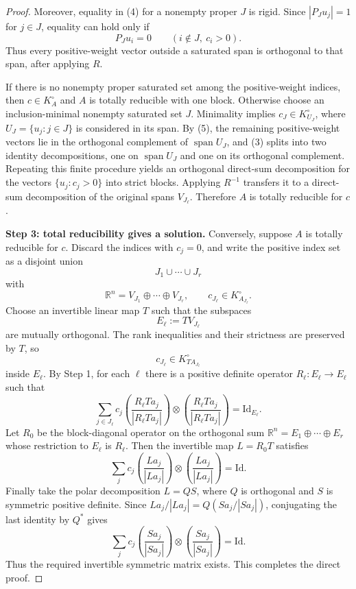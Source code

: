 \documentclass[11pt]{article}
\newcommand{\R}{\mathbb R}
\newcommand{\Id}{\mathrm{Id}}
\newcommand{\spanop}{\operatorname{span}}
\begin{document}
\begin{proof}
Moreover, equality in (4) for a nonempty proper \(J\) is rigid.  Since
\(|P_Ju_j|=1\) for \(j\in J\), equality can hold only if
\[
  P_Ju_i=0
  \qquad(i\notin J,\ c_i>0).
  \tag{5}
\]
Thus every positive-weight vector outside a saturated span is orthogonal to
that span, after applying \(R\).

If there is no nonempty proper saturated set among the positive-weight indices,
then \(c\in K_A^\circ\) and \(A\) is totally reducible with one block.  Otherwise
choose an inclusion-minimal nonempty saturated set \(J\).  Minimality implies
\(c_J\in K_{U_J}^\circ\), where \(U_J=\{u_j:j\in J\}\) is considered in its
span.  By (5), the remaining positive-weight vectors lie in the orthogonal
complement of \(\spanop U_J\), and (3) splits into two identity decompositions,
one on \(\spanop U_J\) and one on its orthogonal complement.  Repeating this
finite procedure yields an orthogonal direct-sum decomposition for the vectors
\(\{u_j:c_j>0\}\) into strict blocks.  Applying \(R^{-1}\) transfers it to a
direct-sum decomposition of the original spans \(V_{J_\ell}\).  Therefore
\(A\) is totally reducible for \(c\).

\medskip
\noindent\textbf{Step 3: total reducibility gives a solution.}
Conversely, suppose \(A\) is totally reducible for \(c\).  Discard the indices
with \(c_j=0\), and write the positive index set as a disjoint union
\[
  J_1\cup\cdots\cup J_r
\]
with
\[
  \R^n=V_{J_1}\oplus\cdots\oplus V_{J_r},
  \qquad
  c_{J_\ell}\in K_{A_{J_\ell}}^\circ.
\]
Choose an invertible linear map \(T\) such that the subspaces
\[
  E_\ell:=T V_{J_\ell}
\]
are mutually orthogonal.  The rank inequalities and their strictness are
preserved by \(T\), so
\[
  c_{J_\ell}\in K_{T A_{J_\ell}}^\circ
\]
inside \(E_\ell\).  By Step 1, for each \(\ell\) there is a positive definite
operator \(R_\ell:E_\ell\to E_\ell\) such that
\[
  \sum_{j\in J_\ell}c_j
  \left(\frac{R_\ell T a_j}{|R_\ell T a_j|}\right)\otimes
  \left(\frac{R_\ell T a_j}{|R_\ell T a_j|}\right)
  =\Id_{E_\ell}.
\]
Let \(R_0\) be the block-diagonal operator on the orthogonal sum
\(\R^n=E_1\oplus\cdots\oplus E_r\) whose restriction to \(E_\ell\) is
\(R_\ell\).  Then the invertible map \(L=R_0T\) satisfies
\[
  \sum_j c_j
  \left(\frac{La_j}{|La_j|}\right)\otimes
  \left(\frac{La_j}{|La_j|}\right)
  =\Id.
\]
Finally take the polar decomposition \(L=QS\), where \(Q\) is orthogonal and
\(S\) is symmetric positive definite.  Since \(La_j/|La_j|=Q(Sa_j/|Sa_j|)\),
conjugating the last identity by \(Q^*\) gives
\[
  \sum_j c_j
  \left(\frac{Sa_j}{|Sa_j|}\right)\otimes
  \left(\frac{Sa_j}{|Sa_j|}\right)
  =\Id.
\]
Thus the required invertible symmetric matrix exists.  This completes the
direct proof.
\end{proof}
\end{document}

